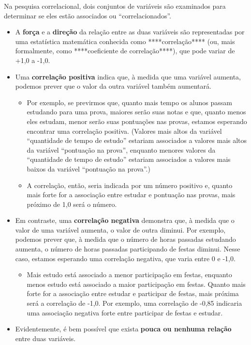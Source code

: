 \documentclass[
]{book}
\providecommand{\tightlist}{%
  \setlength{\itemsep}{0pt}\setlength{\parskip}{0pt}}
\begin{document}
Na pesquisa correlacional, dois conjuntos de variáveis são examinados para determinar se eles estão associados ou ``correlacionados''.

\begin{itemize}
\tightlist
\item
  A \textbf{força} e a \textbf{direção} da relação entre as duas variáveis são representadas por uma estatística matemática conhecida como ****correlação**** (ou, mais formalmente, como ****coeficiente de correlação****), que pode variar de +1,0 a -1,0.
\item
  Uma \textbf{correlação positiva} indica que, à medida que uma variável aumenta, podemos prever que o valor da outra variável também aumentará.

  \begin{itemize}
  \tightlist
  \item
    Por exemplo, se previrmos que, quanto mais tempo os alunos passam estudando para uma prova, maiores serão suas notas e que, quanto menos eles estudam, menor serão suas pontuações nas provas, estamos esperando encontrar uma correlação positiva. (Valores mais altos da variável ``quantidade de tempo de estudo'' estariam associados a valores mais altos da variável ``pontuação na prova'', enquanto menores valores da ``quantidade de tempo de estudo'' estariam associados a valores mais baixos da variável ``pontuação na prova''.)
  \item
    A correlação, então, seria indicada por um número positivo e, quanto mais forte for a associação entre estudar e pontuação nas provas, mais próximo de 1,0 será o número.
  \end{itemize}
\item
  Em contraste, uma \textbf{correlação negativa} demonstra que, à medida que o valor de uma variável aumenta, o valor de outra diminui. Por exemplo, podemos prever que, à medida que o número de horas passadas estudando aumenta, o número de horas passadas participando de festas diminui. Nesse caso, estamos esperando uma correlação negativa, que varia entre 0 e -1,0.

  \begin{itemize}
  \tightlist
  \item
    Mais estudo está associado a menor participação em festas, enquanto menos estudo está associado a maior participação em festas. Quanto mais forte for a associação entre estudar e participar de festas, mais próxima será a correlação de -1,0. Por exemplo, uma correlação de -0,85 indicaria uma associação negativa forte entre participar de festas e estudar.
  \end{itemize}
\item
  Evidentemente, é bem possível que exista \textbf{pouca ou nenhuma relação} entre duas variáveis.


\end{itemize}
\end{document}
